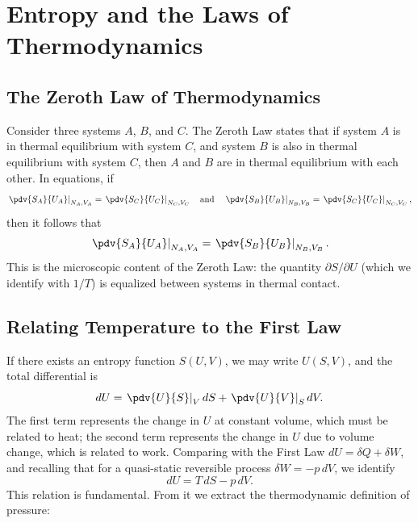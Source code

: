 
\chapter{Entropy and the Laws of Thermodynamics}

\section{The Zeroth Law of Thermodynamics}

Consider three systems $A$, $B$, and $C$. The Zeroth Law states that if system $A$ is in thermal equilibrium with system $C$, and system $B$ is also in thermal equilibrium with system $C$, then $A$ and $B$ are in thermal equilibrium with each other. In equations, if
\begin{equation}
    \left.\pdv{S_A}{U_A}\right|_{N_A, V_A} = \left.\pdv{S_C}{U_C}\right|_{N_C, V_C}
    \quad \text{and} \quad
    \left.\pdv{S_B}{U_B}\right|_{N_B, V_B} = \left.\pdv{S_C}{U_C}\right|_{N_C, V_C},
\end{equation}
then it follows that
\begin{equation}
    \left.\pdv{S_A}{U_A}\right|_{N_A, V_A} = \left.\pdv{S_B}{U_B}\right|_{N_B, V_B}.
\end{equation}
This is the microscopic content of the Zeroth Law: the quantity $\partial S/\partial U$ (which we identify with $1/T$) is equalized between systems in thermal contact.

\section{Relating Temperature to the First Law}

If there exists an entropy function $S(U, V)$, we may write $U(S, V)$, and the total differential is
\begin{equation}
    dU = \left.\pdv{U}{S}\right|_V dS + \left.\pdv{U}{V}\right|_S dV.
\end{equation}
The first term represents the change in $U$ at constant volume, which must be related to heat; the second term represents the change in $U$ due to volume change, which is related to work. Comparing with the First Law $dU = \delta Q + \delta W$, and recalling that for a quasi-static reversible process $\delta W = -p\,dV$, we identify
\begin{equation}
    dU = T\,dS - p\,dV.
\end{equation}
This relation is fundamental. From it we extract the thermodynamic definition of pressure:

